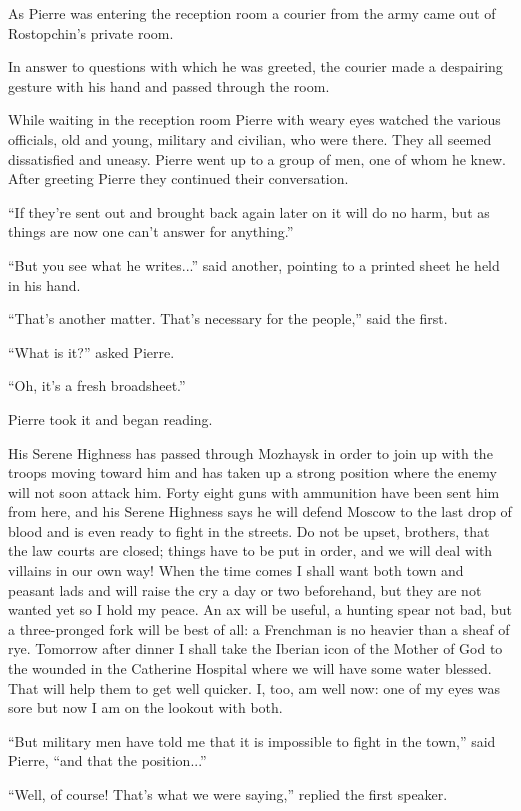 As Pierre was entering the reception room a courier from the army
came out of Rostopchin's private room.

In answer to questions with which he was greeted, the courier
made a despairing gesture with his hand and passed through the
room.

While waiting in the reception room Pierre with weary eyes
watched the various officials, old and young, military and
civilian, who were there.  They all seemed dissatisfied and
uneasy. Pierre went up to a group of men, one of whom he
knew. After greeting Pierre they continued their conversation.

``If they're sent out and brought back again later on it will do
no harm, but as things are now one can't answer for anything.''

``But you see what he writes...'' said another, pointing to a
printed sheet he held in his hand.

``That's another matter. That's necessary for the people,'' said
the first.

``What is it?'' asked Pierre.

``Oh, it's a fresh broadsheet.''

Pierre took it and began reading.

His Serene Highness has passed through Mozhaysk in order to join
up with the troops moving toward him and has taken up a strong
position where the enemy will not soon attack him. Forty eight
guns with ammunition have been sent him from here, and his Serene
Highness says he will defend Moscow to the last drop of blood and
is even ready to fight in the streets. Do not be upset, brothers,
that the law courts are closed; things have to be put in order,
and we will deal with villains in our own way! When the time
comes I shall want both town and peasant lads and will raise the
cry a day or two beforehand, but they are not wanted yet so I
hold my peace. An ax will be useful, a hunting spear not bad, but
a three-pronged fork will be best of all: a Frenchman is no
heavier than a sheaf of rye. Tomorrow after dinner I shall take
the Iberian icon of the Mother of God to the wounded in the
Catherine Hospital where we will have some water blessed. That
will help them to get well quicker. I, too, am well now: one of
my eyes was sore but now I am on the lookout with both.

``But military men have told me that it is impossible to fight in
the town,'' said Pierre, ``and that the position...''

``Well, of course! That's what we were saying,'' replied the
first speaker.

